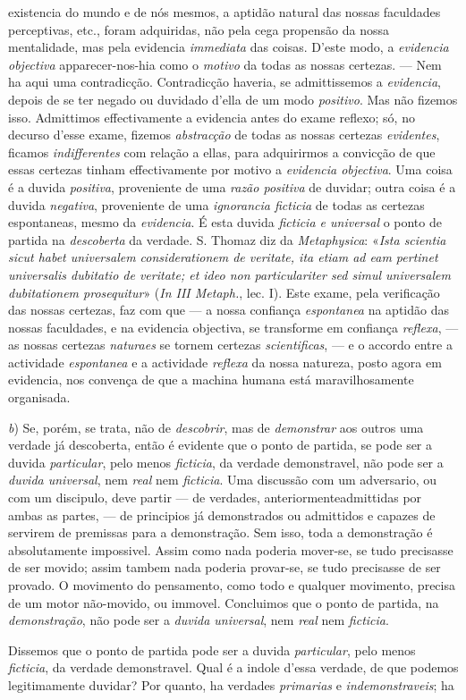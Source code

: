 existencia do mundo e de nós mesmos, a aptidão natural das nossas faculdades perceptivas, etc., foram adquiridas, não pela cega propensão da nossa mentalidade, mas pela evidencia \emph{immediata} das coisas. D'este modo, a \emph{evidencia objectiva} apparecer-nos-hia como o \emph{motivo} da todas as nossas certezas. --- Nem ha aqui uma contradicção. Contradicção haveria, se admittissemos a \emph{evidencia}, depois de se ter negado ou duvidado d'ella de um modo \emph{positivo}. Mas não fizemos isso. Admittimos effectivamente a evidencia antes do exame reflexo; só, no decurso d'esse exame, fizemos \emph{abstracção} de todas as nossas certezas \emph{evidentes}, ficamos \emph{indifferentes} com relação a ellas, para adquirirmos a convicção de que essas certezas tinham effectivamente por motivo a \emph{evidencia objectiva}. Uma coisa é a duvida \emph{positiva}, proveniente de uma \emph{razão positiva} de duvidar; outra coisa é a duvida \emph{negativa}, proveniente de uma \emph{ignorancia ficticia} de todas as certezas espontaneas, mesmo da \emph{evidencia}. É esta duvida \emph{ficticia e universal} o ponto de partida na \emph{descoberta} da verdade. S. Thomaz diz da \emph{Metaphysica}: «\emph{Ista scientia sicut habet universalem considerationem de veritate, ita etiam ad eam pertinet universalis dubitatio de veritate; et ideo non particulariter sed simul universalem dubitationem prosequitur}» (\emph{In III Metaph.}, lec. I). Este exame, pela verificação das nossas certezas, faz com que --- a nossa confiança \emph{espontanea} na aptidão das nossas faculdades, e na evidencia objectiva, se transforme em confiança \emph{reflexa}, --- as nossas certezas \emph{naturaes} se tornem certezas \emph{scientificas}, --- e o accordo entre a actividade \emph{espontanea} e a actividade \emph{reflexa} da nossa natureza, posto agora em evidencia, nos convença de que a machina humana está maravilhosamente organisada.\par \emph{b}) Se, porém, se trata, não de \emph{descobrir}, mas de \emph{demonstrar} aos outros uma verdade já descoberta, então é evidente que o ponto de partida, se pode ser a duvida \emph{particular}, pelo menos \emph{ficticia}, da verdade demonstravel, não pode ser a \emph{duvida universal}, nem \emph{real} nem \emph{ficticia}. Uma discussão com um adversario, ou com um discipulo, deve partir --- de verdades, anteriormenteadmittidas por ambas as partes, --- de principios já demonstrados ou admittidos e capazes de servirem de premissas para a demonstração. Sem isso, toda a demonstração é absolutamente impossivel. Assim como nada poderia mover-se, se tudo precisasse de ser movido; assim tambem nada poderia provar-se, se tudo precisasse de ser provado. O movimento do pensamento, como todo e qualquer movimento, precisa de um motor não-movido, ou immovel. Concluimos que o ponto de partida, na \emph{demonstração}, não pode ser a \emph{duvida universal}, nem \emph{real} nem \emph{ficticia}.\par Dissemos que o ponto de partida pode ser a duvida \emph{particular}, pelo menos \emph{ficticia}, da verdade demonstravel. Qual é a indole d'essa verdade, de que podemos legitimamente duvidar? Por quanto, ha verdades \emph{primarias} e \emph{indemonstraveis}; ha 